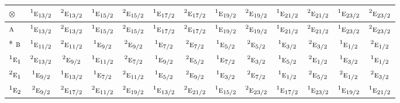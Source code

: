 \documentclass[10pt,a4paper]{article}
\numberwithin{equation}{section}
\newcommand{\irr}[1]{\text{\normalfont\scshape #1}}
\newcommand{\conjpair}[1]{{}^{#1}}
\newcommand{\irrprod}{\otimes}
\begin{document}
{\small\setlength{\tabcolsep}{3pt}\begin{longtable}{@{}lcccccccccccc@{}}\toprule
$\irrprod$ & $\conjpair{1}\irr{e}_{13/2}$ & $\conjpair{2}\irr{e}_{13/2}$ & $\conjpair{1}\irr{e}_{15/2}$ & $\conjpair{2}\irr{e}_{15/2}$ & $\conjpair{1}\irr{e}_{17/2}$ & $\conjpair{2}\irr{e}_{17/2}$ & $\conjpair{1}\irr{e}_{19/2}$ & $\conjpair{2}\irr{e}_{19/2}$ & $\conjpair{1}\irr{e}_{21/2}$ & $\conjpair{2}\irr{e}_{21/2}$ & $\conjpair{1}\irr{e}_{23/2}$ & $\conjpair{2}\irr{e}_{23/2}$\\\midrule\endhead
\bottomrule\endfoot\endlastfoot
$\irr{a}$ & $\conjpair{1}\irr{e}_{13/2}$ & $\conjpair{2}\irr{e}_{13/2}$ & $\conjpair{1}\irr{e}_{15/2}$ & $\conjpair{2}\irr{e}_{15/2}$ & $\conjpair{1}\irr{e}_{17/2}$ & $\conjpair{2}\irr{e}_{17/2}$ & $\conjpair{1}\irr{e}_{19/2}$ & $\conjpair{2}\irr{e}_{19/2}$ & $\conjpair{1}\irr{e}_{21/2}$ & $\conjpair{2}\irr{e}_{21/2}$ & $\conjpair{1}\irr{e}_{23/2}$ & $\conjpair{2}\irr{e}_{23/2}$\\*
$\irr{b}$ & $\conjpair{1}\irr{e}_{11/2}$ & $\conjpair{2}\irr{e}_{11/2}$ & $\conjpair{1}\irr{e}_{9/2}$ & $\conjpair{2}\irr{e}_{9/2}$ & $\conjpair{1}\irr{e}_{7/2}$ & $\conjpair{2}\irr{e}_{7/2}$ & $\conjpair{1}\irr{e}_{5/2}$ & $\conjpair{2}\irr{e}_{5/2}$ & $\conjpair{1}\irr{e}_{3/2}$ & $\conjpair{2}\irr{e}_{3/2}$ & $\conjpair{1}\irr{e}_{1/2}$ & $\conjpair{2}\irr{e}_{1/2}$\\
$\conjpair{1}\irr{e}_{1}$ & $\conjpair{2}\irr{e}_{13/2}$ & $\conjpair{2}\irr{e}_{9/2}$ & $\conjpair{1}\irr{e}_{11/2}$ & $\conjpair{2}\irr{e}_{7/2}$ & $\conjpair{1}\irr{e}_{9/2}$ & $\conjpair{2}\irr{e}_{5/2}$ & $\conjpair{1}\irr{e}_{7/2}$ & $\conjpair{2}\irr{e}_{3/2}$ & $\conjpair{1}\irr{e}_{5/2}$ & $\conjpair{2}\irr{e}_{1/2}$ & $\conjpair{1}\irr{e}_{3/2}$ & $\conjpair{1}\irr{e}_{1/2}$\\
$\conjpair{2}\irr{e}_{1}$ & $\conjpair{1}\irr{e}_{9/2}$ & $\conjpair{1}\irr{e}_{13/2}$ & $\conjpair{1}\irr{e}_{7/2}$ & $\conjpair{2}\irr{e}_{11/2}$ & $\conjpair{1}\irr{e}_{5/2}$ & $\conjpair{2}\irr{e}_{9/2}$ & $\conjpair{1}\irr{e}_{3/2}$ & $\conjpair{2}\irr{e}_{7/2}$ & $\conjpair{1}\irr{e}_{1/2}$ & $\conjpair{2}\irr{e}_{5/2}$ & $\conjpair{2}\irr{e}_{1/2}$ & $\conjpair{2}\irr{e}_{3/2}$\\
$\conjpair{1}\irr{e}_{2}$ & $\conjpair{2}\irr{e}_{9/2}$ & $\conjpair{2}\irr{e}_{17/2}$ & $\conjpair{2}\irr{e}_{11/2}$ & $\conjpair{2}\irr{e}_{19/2}$ & $\conjpair{1}\irr{e}_{13/2}$ & $\conjpair{2}\irr{e}_{21/2}$ & $\conjpair{1}\irr{e}_{15/2}$ & $\conjpair{2}\irr{e}_{23/2}$ & $\conjpair{1}\irr{e}_{17/2}$ & $\conjpair{1}\irr{e}_{23/2}$ & $\conjpair{1}\irr{e}_{19/2}$ & $\conjpair{1}\irr{e}_{21/2}$\\

\end{longtable}}
\end{document}
